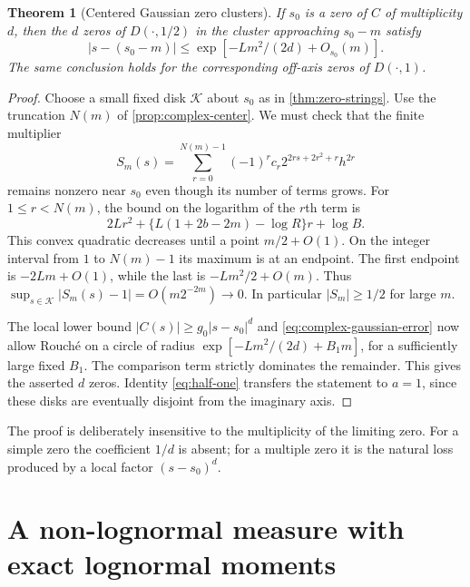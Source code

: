 \documentclass[11pt,a4paper]{article}
\numberwithin{equation}{section}
\newtheorem{theorem}{Theorem}[section]
\theoremstyle{definition}
\theoremstyle{remark}
\newcommand{\abs}[1]{\left|#1\right|}
\begin{document}
\begin{theorem}[Centered Gaussian zero clusters]
\label{thm:zero-gaussian}
If $s_0$ is a zero of $C$ of multiplicity $d$, then the $d$ zeros of
$D(\cdot,1/2)$ in the cluster approaching $s_0-m$ satisfy
\begin{equation}
 \abs{s-(s_0-m)}
 \le\exp[-Lm^2/(2d)+O_{s_0}(m)].
 \label{eq:center-zero-bound}
\end{equation}
The same conclusion holds for the corresponding off-axis zeros of
$D(\cdot,1)$.
\end{theorem}
\begin{proof}
Choose a small fixed disk $\mathcal K$ about $s_0$ as in
\cref{thm:zero-strings}. Use the truncation $N(m)$ of
\cref{prop:complex-center}. We must check that the finite
multiplier
\[
 S_m(s)=\sum_{r=0}^{N(m)-1}(-1)^rc_r
        2^{2rs+2r^2+r}h^{2r}
\]
remains nonzero near $s_0$ even though its number of terms grows.
For $1\le r<N(m)$, the bound on the logarithm of the $r$th term is
\[
 2Lr^2+\{L(1+2b-2m)-\log R\}r+\log B.
\]
This convex quadratic decreases until a point $m/2+O(1)$.
On the integer interval from $1$ to $N(m)-1$ its maximum is at an
endpoint. The first endpoint is $-2Lm+O(1)$, while the last is
$-Lm^2/2+O(m)$. Thus
$\sup_{s\in\mathcal K}\abs{S_m(s)-1}=O(m2^{-2m})\to0$.
In particular $\abs{S_m}\ge1/2$ for large $m$.

The local lower bound $\abs{C(s)}\ge g_0\abs{s-s_0}^d$ and
\cref{eq:complex-gaussian-error} now allow Rouch\'e on a circle of
radius $\exp[-Lm^2/(2d)+B_1m]$, for a sufficiently large fixed
$B_1$. The comparison term strictly dominates the remainder.
This gives the asserted $d$ zeros. Identity \cref{eq:half-one}
transfers the statement to $a=1$, since these disks are eventually
disjoint from the imaginary axis.
\end{proof}

The proof is deliberately insensitive to the multiplicity of the
limiting zero. For a simple zero the coefficient $1/d$ is absent;
for a multiple zero it is the natural loss produced by a local
factor $(s-s_0)^d$.

\section{A non-lognormal measure with exact lognormal moments}
\label{sec:moments}
\end{document}
